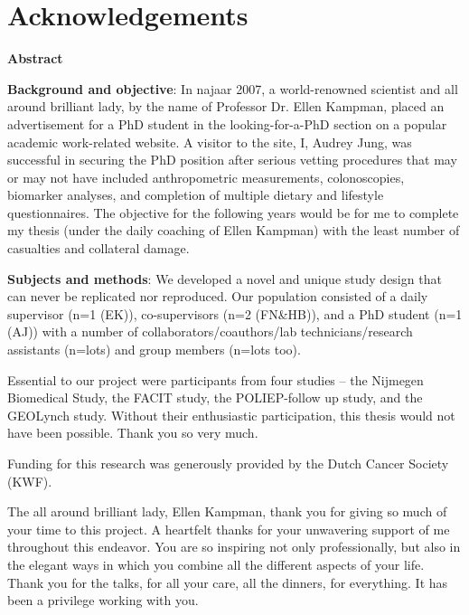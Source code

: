 \chapter*{Acknowledgements}
\label{acknowledgements}


\pagebreak

\noindent \textbf{Abstract}

\noindent \textbf{Background and objective}: In najaar 2007, a world-renowned scientist and all around brilliant lady, by the name of Professor Dr. Ellen Kampman, placed an advertisement for a PhD student in the looking-for-a-PhD section on a popular academic work-related website. A visitor to the site, I, Audrey Jung, was successful in securing the PhD position after serious vetting procedures that may or may not have included anthropometric measurements, colonoscopies, biomarker analyses, and completion of multiple dietary and lifestyle questionnaires. The objective for the following years would be for me to complete my thesis (under the daily coaching of Ellen Kampman) with the least number of casualties and collateral damage.

\noindent \textbf{Subjects and methods}: We developed a novel and unique study design that can never be replicated nor reproduced. Our population consisted of a daily supervisor (n=1 (EK)), co-supervisors (n=2 (FN\&HB)), and a PhD student (n=1 (AJ)) with a number of collaborators/coauthors/lab technicians/research assistants (n=lots) and group members (n=lots too).

\noindent Essential to our project were participants from four studies -- the Nijmegen Biomedical Study, the FACIT study, the POLIEP-follow up study, and the GEOLynch study. Without their enthusiastic participation, this thesis would not have been possible. Thank you so very much.

\noindent Funding for this research was generously provided by the Dutch Cancer Society (KWF).

\noindent The all around brilliant lady, Ellen Kampman, thank you for giving so much of your time to this project. A heartfelt thanks for your unwavering support of me throughout this endeavor. You are so inspiring not only professionally, but also in the elegant ways in which you combine all the different aspects of your life. Thank you for the talks, for all your care, all the dinners, for everything. It has been a privilege working with you.

